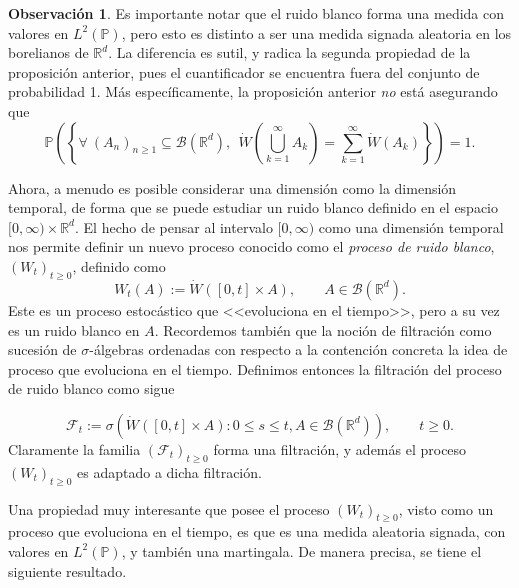 \documentclass[letterpaper,twoside,12pt]{book}
\newcommand{\R}{\mathbb{R}}
\newcommand{\F}{\mathcal{F}}
\newcommand{\B}{\mathcal{B}}
\renewcommand{\P}{\mathbb{P}}
\newcommand{\W}{\dot{W}}
\newcommand{\1}{\mathds{1}}
\theoremstyle{definition}
\theoremstyle{definition}
\theoremstyle{remark}
\theoremstyle{definition}
\theoremstyle{definition}
\theoremstyle{definition}
\newtheorem{obs}{Observación}
\theoremstyle{definition}
\theoremstyle{definition}
\begin{document}
 \begin{obs}
   Es importante notar que el ruido blanco forma una medida con valores en $L^{2}(\P)$, pero esto es distinto a ser una medida signada aleatoria en los borelianos de $\R^d$. La diferencia es sutil, y radica la segunda propiedad de la proposición anterior, pues el cuantificador se encuentra fuera del conjunto de probabilidad 1. Más específicamente, la proposición anterior \textit{no} está asegurando que 
   \[
   \P\left(\left\{\forall \ (A_n)_{n\geq1}\subseteq\B(\R^{d}), \ \ \W \left(\bigcup_{k=1}^\infty A_k\right)=\sum_{k=1}^{\infty}\W(A_k)\right\}\right)=1.
   \]
\end{obs}
Ahora, a menudo es posible considerar una dimensión como la dimensión temporal, de forma que se puede estudiar un ruido blanco definido en el espacio $[0,\infty)\times\R^{d}$. El hecho de pensar al intervalo $[0,\infty)$ como una dimensión temporal nos permite definir un nuevo proceso conocido como el \textit{proceso de ruido blanco}, $(W_t)_{t\geq0}$, definido como 
\[
W_t(A):=\W \left([0,t]\times A\right), \qquad A\in \B(\R^{d}).    
\]
Este es un proceso estocástico que <<evoluciona en el tiempo>>, pero a su vez es un ruido blanco en $A$. Recordemos también que la noción de filtración como sucesión de $\sigma$-álgebras ordenadas con respecto a la contención concreta la idea de proceso que evoluciona en el tiempo. Definimos entonces la filtración del proceso de ruido blanco como sigue

\begin{equation}\label{filtracionruidoblanco}
   \F_t:=\sigma \left(\W([0,t]\times A):0\leq s\leq t, A\in \B(\R^{d})\right), \qquad t\geq0.    
\end{equation}
Claramente la familia $(\F_t)_{t\geq0}$ forma una filtración, y además el proceso $(W_t)_{t\geq0}$ es adaptado a dicha filtración.

Una propiedad muy interesante que posee el proceso $(W_t)_{t\geq0}$, visto como un proceso que evoluciona en el tiempo, es que es una medida aleatoria signada, con valores en $L^2(\P)$, y también una martingala. De manera precisa, se tiene el siguiente resultado.
\end{document}
